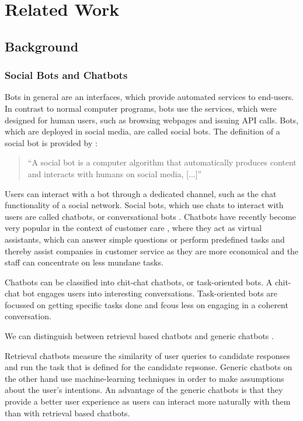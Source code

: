 \chapter{Related Work}

\section{Background}

\subsection{Social Bots and Chatbots}
Bots in general are an interfaces, which provide automated services to end-users. In contrast to normal computer programs, bots use the services, which were designed for human users, such as browsing webpages and issuing API calls. Bots, which are deployed in social media, are called social bots. The definition of a social bot is provided by \cite{FVD*16b}:
\begin{quote}
    ``A social bot is a computer algorithm that automatically produces content and interacts with humans on social media, [...]''
\end{quote}

Users can interact with a bot through a dedicated channel, such as the chat functionality of a social network. Social bots, which use chats to interact with users are called chatbots, or conversational bots \cite{WWX*16}. Chatbots have recently become very popular in the context of customer care \cite{CHW*17,FVD*16b}, where they act as virtual assistants, which can answer simple questions or perform predefined tasks and thereby assist companies in customer service as they are more economical and the staff can concentrate on less mundane tasks.

Chatbots can be classified into chit-chat chatbots, or task-oriented bots. A chit-chat bot engages users into interesting conversations. Task-oriented bots are focussed on getting specific tasks done and fcous less on engaging in a coherent conversation.

We can distinguish between retrieval based chatbots and generic chatbots \cite{NLKl19,WWX*16}.

Retrieval chatbots measure the similarity of user queries to candidate responses and run the task that is defined for the candidate repsonse. Generic chatbots on the other hand use machine-learning techniques in order to make assumptions about the user's intentions. An advantage of the generic chatbots is that they provide a better user experience as users can interact more naturally with them than with retrieval based chatbots.

